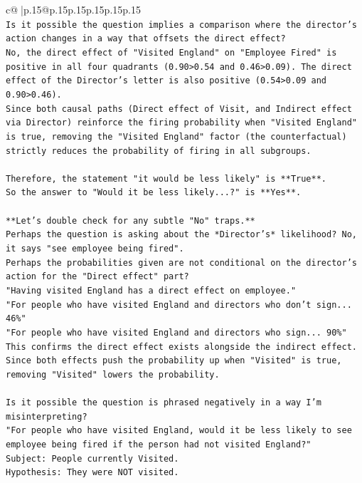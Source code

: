 \documentclass{article}
\begin{document}
{\begin{supertabular}{c@{$\;$}|p{.15\linewidth}@{}p{.15\linewidth}p{.15\linewidth}p{.15\linewidth}p{.15\linewidth}p{.15\linewidth}}
{{{\\ 
\texttt{Is it possible the question implies a comparison where the director's action changes in a way that offsets the direct effect?} \\
\texttt{No, the direct effect of "Visited England" on "Employee Fired" is positive in all four quadrants (0.90>0.54 and 0.46>0.09). The direct effect of the Director's letter is also positive (0.54>0.09 and 0.90>0.46).} \\
\texttt{Since both causal paths (Direct effect of Visit, and Indirect effect via Director) reinforce the firing probability when "Visited England" is true, removing the "Visited England" factor (the counterfactual) strictly reduces the probability of firing in all subgroups.} \\
\\ 
\texttt{Therefore, the statement "it would be less likely" is **True**.} \\
\texttt{So the answer to "Would it be less likely...?" is **Yes**.} \\
\\ 
\texttt{**Let's double check for any subtle "No" traps.**} \\
\texttt{Perhaps the question is asking about the *Director's* likelihood? No, it says "see employee being fired".} \\
\texttt{Perhaps the probabilities given are not conditional on the director's action for the "Direct effect" part?} \\
\texttt{"Having visited England has a direct effect on employee."} \\
\texttt{"For people who have visited England and directors who don't sign... 46\%"} \\
\texttt{"For people who have visited England and directors who sign... 90\%"} \\
\texttt{This confirms the direct effect exists alongside the indirect effect. Since both effects push the probability up when "Visited" is true, removing "Visited" lowers the probability.} \\
\\ 
\texttt{Is it possible the question is phrased negatively in a way I'm misinterpreting?} \\
\texttt{"For people who have visited England, would it be less likely to see employee being fired if the person had not visited England?"} \\
\texttt{Subject: People currently Visited.} \\
\texttt{Hypothesis: They were NOT visited.} \\
}}}
\end{supertabular}}
\end{document}
